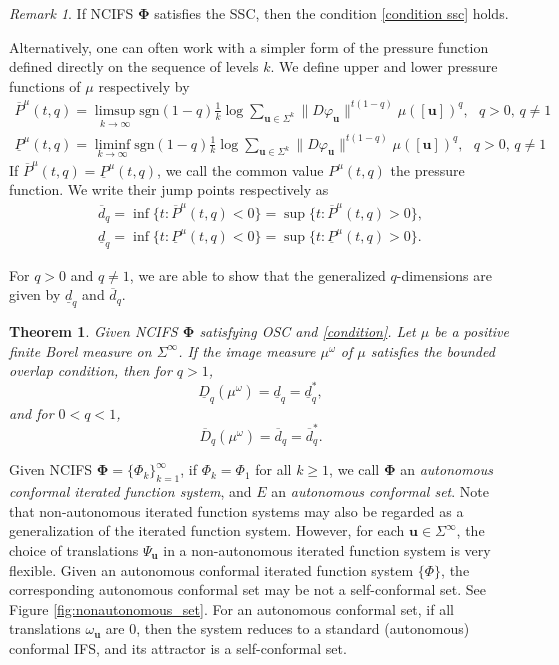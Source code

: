 \documentclass[12pt]{amsart}
\theoremstyle{plain}
\newtheorem{thm}{Theorem}[section]
\theoremstyle{definition}
\theoremstyle{remark}
\newtheorem{rem}{Remark}
\newcommand{\bu}{\mathbf{u}}
\begin{document}
\begin{rem}
If NCIFS $\boldsymbol{\Phi}$ satisfies the SSC, then the condition \eqref{condition ssc} holds.
\end{rem}

Alternatively, one can often work with a simpler form of the pressure function defined directly on the sequence of levels $k$. We define upper and lower pressure functions of $\mu$ respectively by  
\begin{equation}\label{def_ULPF}
\begin{split}
\overline P^\mu(t, q)=\limsup_{k\to \infty} \mbox{sgn}(1-q)\frac{1}{k}\log \sum_{\mathbf{u}\in\Sigma^k}\|D\varphi_\mathbf{u}\|^{t(1-q)}\mu([\bu])^q ,  \textit{  $q>0$, $q\not=1$}   
\\
\underline P^\mu(t, q)= \liminf_{k\to \infty} \mbox{sgn}(1-q)\frac{1}{k}\log \sum_{\mathbf{u}\in\Sigma^k}\|D\varphi_\mathbf{u}\|^{t(1-q)}\mu([\bu])^q ,  \textit{  $q>0$, $q\not=1$}   
\end{split}
\end{equation}    
If $\overline P^\mu(t, q)=\underline P^\mu(t, q)$, we call the common value $P^\mu(t, q)$  the pressure function.
We write their jump points respectively as
\begin{equation}\label{dl}
\begin{split}
\overline{d}_q=\inf\{t:\overline P^\mu(t, q)<0\}=\sup\{t:\overline P^\mu(t, q)>0\},  \\
\underline{d}_q=\inf\{t:\underline P^\mu(t, q)<0\}=\sup\{t:\underline P^\mu(t, q)>0\}.
\end{split}
\end{equation}  

For $q>0$ and $q\neq 1$, we are able to show that the generalized $q$-dimensions are given by $\underline{d}_q$ and $\overline{d}_q$. 
\begin{thm}\label{simple}
Given NCIFS $\boldsymbol{\Phi}$ satisfying OSC and \eqref{condition}.  Let $\mu$ be a  positive  finite Borel measure on $\Sigma^\infty$. If the image measure $\mu^\omega$  of $\mu$ satisfies the bounded overlap condition, then for $q>1$,
$$
\underline{D}_q(\mu^\omega)=\underline{d}_q=\underline{d}_q^*,
$$
and for $0<q<1$,
$$
\overline{D}_q(\mu^\omega)=\overline{d}_q =\overline{d}_q^*.
$$
\end{thm}



Given NCIFS $\boldsymbol{\Phi}=\{\Phi_k\}_{k=1}^\infty$, if $\Phi_k=\Phi_1$ for all $k\geq 1$, we call  $\boldsymbol{\Phi}$ an \emph{autonomous conformal iterated function system}, and $E$ an \emph{autonomous conformal set}. Note that non-autonomous iterated function systems may also be regarded as a generalization of the iterated  function system. However, for each $\bu\in\Sigma^\infty$, the choice of translations $\Psi_\bu$ in a non-autonomous iterated function system is very flexible. Given an autonomous conformal iterated function system $\{\Phi\}$, the corresponding autonomous conformal set may be not a self-conformal set. See Figure \ref{fig:nonautonomous_set}. For an autonomous conformal set, if all translations  $\omega_\bu$ are $0$, then the system reduces to a standard (autonomous) conformal IFS, and its attractor is a self-conformal set.
\end{document}
